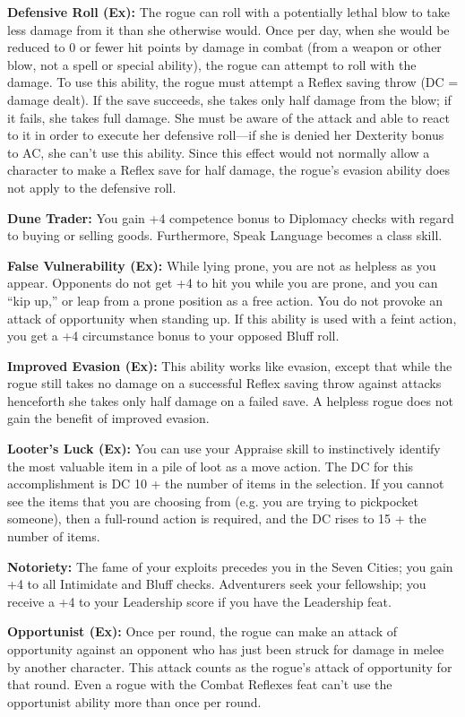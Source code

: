 \textbf{Defensive Roll (Ex):} The rogue can roll with a potentially lethal blow to take less damage from it than she otherwise would. Once per day, when she would be reduced to 0 or fewer hit points by damage in combat (from a weapon or other blow, not a spell or special ability), the rogue can attempt to roll with the damage. To use this ability, the rogue must attempt a Reflex saving throw (DC = damage dealt). If the save succeeds, she takes only half damage from the blow; if it fails, she takes full damage. She must be aware of the attack and able to react to it in order to execute her defensive roll—if she is denied her Dexterity bonus to AC, she can’t use this ability. Since this effect would not normally allow a character to make a Reflex save for half damage, the rogue’s evasion ability does not apply to the defensive roll.

\textbf{Dune Trader:} You gain +4 competence bonus to Diplomacy checks with regard to buying or selling goods. Furthermore, Speak Language becomes a class skill.

\textbf{False Vulnerability (Ex):} While lying prone, you are not as helpless as you appear. Opponents do not get +4 to hit you while you are prone, and you can “kip up,” or leap from a prone position as a free action. You do not provoke an attack of opportunity when standing up. If this ability is used with a feint action, you get a +4 circumstance bonus to your opposed Bluff roll.

\textbf{Improved Evasion (Ex):} This ability works like evasion, except that while the rogue still takes no damage on a successful Reflex saving throw against attacks henceforth she takes only half damage on a failed save. A helpless rogue does not gain the benefit of improved evasion.

\textbf{Looter’s Luck (Ex):} You can use your Appraise skill to instinctively identify the most valuable item in a pile of loot as a move action. The DC for this accomplishment is DC 10 + the number of items in the selection. If you cannot see the items that you are choosing from (e.g. you are trying to pickpocket someone), then a full-round action is required, and the DC rises to 15 + the number of items.

\textbf{Notoriety:} The fame of your exploits precedes you in the Seven Cities; you gain +4 to all Intimidate and Bluff checks. Adventurers seek your fellowship; you receive a +4 to your Leadership score if you have the Leadership feat.

\textbf{Opportunist (Ex):} Once per round, the rogue can make an attack of opportunity against an opponent who has just been struck for damage in melee by another character. This attack counts as the rogue’s attack of opportunity for that round. Even a rogue with the Combat Reflexes feat can’t use the opportunist ability more than once per round.

